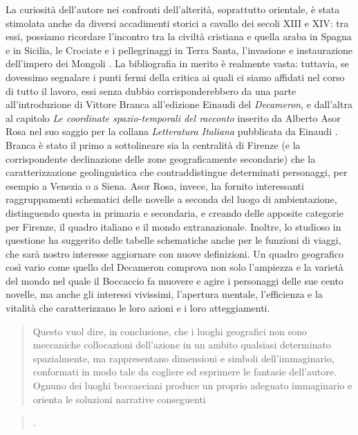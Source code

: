 La curiosità dell'autore nei confronti dell'alterità, soprattutto
orientale, è stata stimolata anche da diversi accadimenti storici a
cavallo dei secoli XIII e XIV: tra essi, possiamo ricordare l'incontro
tra la civiltà cristiana e quella araba in Spagna e in Sicilia, le
Crociate e i pellegrinaggi in Terra Santa, l'invasione e instaurazione
dell'impero dei Mongoli \autocite[p.~20]{morosini2010}. La bibliografia
in merito è realmente vasta: tuttavia, se dovessimo segnalare i punti
fermi della critica ai quali ci siamo affidati nel corso di tutto il
lavoro, essi senza dubbio corrisponderebbero da una parte
all'introduzione di Vittore Branca all'edizione Einaudi del
\emph{Decameron}, e dall'altra al capitolo \emph{Le coordinate
spazio-temporali del racconto} inserito da Alberto Asor Rosa nel suo
saggio per la collana \emph{Letteratura Italiana} pubblicata da Einaudi
\autocite{asor1992}. Branca è stato il primo a sottolineare sia la
centralità di Firenze (e la corrispondente declinazione delle zone
geograficamente secondarie) che la caratterizzazione geolinguistica che
contraddistingue determinati personaggi, per esempio a Venezia o a
Siena. Asor Rosa, invece, ha fornito interessanti raggruppamenti
schematici delle novelle a seconda del luogo di ambientazione,
distinguendo questa in primaria e secondaria, e creando delle apposite
categorie per Firenze, il quadro italiano e il mondo extranazionale.
Inoltre, lo studioso in questione ha suggerito delle tabelle schematiche
anche per le funzioni di viaggi, che sarà nostro interesse aggiornare
con nuove definizioni. Un quadro geografico così vario come quello del
Decameron comprova non solo l'ampiezza e la varietà del mondo nel quale
il Boccaccio fa muovere e agire i personaggi delle sue cento novelle, ma
anche gli interessi vivissimi, l'apertura mentale, l'efficienza e la
vitalità che caratterizzano le loro azioni e i loro atteggiamenti.

\begin{quote}
Questo vuol dire, in conclusione, che i luoghi geografici non sono
meccaniche collocazioni dell'azione in un ambito qualsiasi determinato
spazialmente, ma rappresentano dimensioni e simboli dell'immaginario,
conformati in modo tale da cogliere ed esprimere le fantasie
dell'autore. Ognuno dei luoghi boccacciani produce un proprio adeguato
immaginario e orienta le soluzioni narrative conseguenti
\end{quote}

\begin{quote}
\autocite[p.~548]{asor1992}.
\end{quote}

